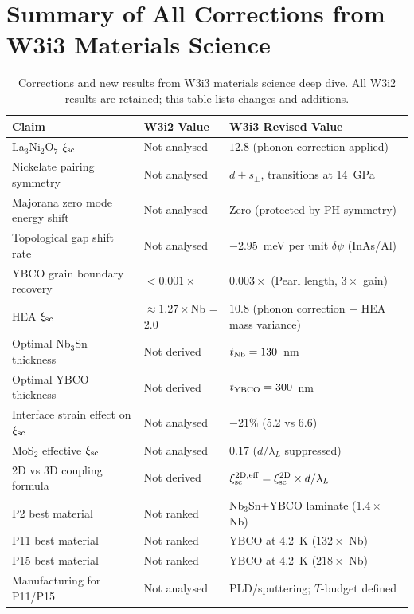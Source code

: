 \documentclass[11pt]{article}
\begin{document}
\section*{Summary of All Corrections from W3i3 Materials Science}

\begin{table}[h]
\centering
\caption{Corrections and new results from W3i3 materials science deep dive.
All W3i2 results are retained; this table lists changes and additions.}
\label{tab:corrections-W3i3}
\begin{tabular}{p{4.5cm}p{3.5cm}p{5cm}}
\toprule
Claim & W3i2 Value & W3i3 Revised Value \\
\midrule
La$_3$Ni$_2$O$_7$ $\xi_{\rm sc}$ & Not analysed & $12.8$ (phonon correction applied) \\
Nickelate pairing symmetry & Not analysed & $d + s_\pm$, transitions at 14~GPa \\
Majorana zero mode energy shift & Not analysed & Zero (protected by PH symmetry) \\
Topological gap shift rate & Not analysed & $-2.95$~meV per unit $\delta\psi$ (InAs/Al) \\
YBCO grain boundary recovery & $<0.001\times$ & $0.003\times$ (Pearl length, $3\times$ gain) \\
HEA $\xi_{\rm sc}$ & $\approx 1.27\times$Nb = $2.0$ & $10.8$ (phonon correction + HEA mass variance) \\
Optimal Nb$_3$Sn thickness & Not derived & $t_{\rm Nb} = 130$~nm \\
Optimal YBCO thickness & Not derived & $t_{\rm YBCO} = 300$~nm \\
Interface strain effect on $\xi_{\rm sc}$ & Not analysed & $-21\%$ (5.2 vs 6.6) \\
MoS$_2$ effective $\xi_{\rm sc}$ & Not analysed & $0.17$ ($d/\lambda_L$ suppressed) \\
2D vs 3D coupling formula & Not derived & $\xi_{\rm sc}^{\rm 2D,eff} = \xi_{\rm sc}^{\rm 2D} \times d/\lambda_L$ \\
P2 best material & Not ranked & Nb$_3$Sn+YBCO laminate ($1.4\times$ Nb) \\
P11 best material & Not ranked & YBCO at 4.2~K ($132\times$ Nb) \\
P15 best material & Not ranked & YBCO at 4.2~K ($218\times$ Nb) \\
Manufacturing for P11/P15 & Not analysed & PLD/sputtering; $T$-budget defined \\
\bottomrule
\end{tabular}
\end{table}
\end{document}
